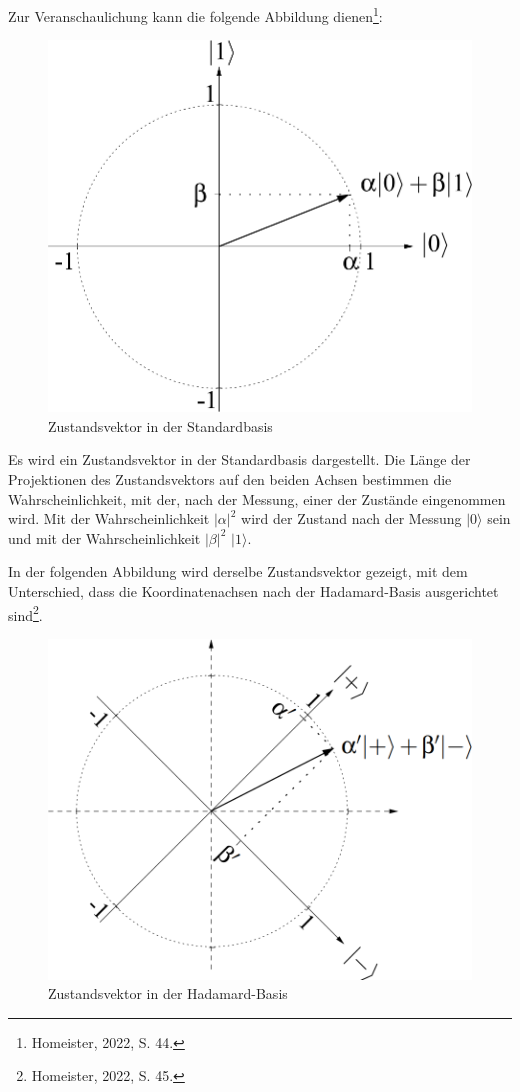 Zur Veranschaulichung kann die folgende Abbildung dienen\footnote{Homeister, 2022, S. 44.}: \\


\begin{figure}[!h]
    \centering
    \includegraphics[width=0.5\linewidth]{img/Zustandsvektor_Standardbasis.png}
    \caption{Zustandsvektor in der Standardbasis}
    \label{fig:Standardbasis}
\end{figure}

Es wird ein Zustandsvektor in der Standardbasis dargestellt. Die Länge der Projektionen des Zustandsvektors auf den beiden Achsen bestimmen die Wahrscheinlichkeit, mit der, nach der Messung, einer der Zustände eingenommen wird. Mit der Wahrscheinlichkeit $\left|\alpha\right|^2$ wird der Zustand nach der Messung $\left|0\right.\rangle$ sein und mit der Wahrscheinlichkeit $\left|\beta\right|^2$ $\left|1\right.\rangle$. 

In der folgenden Abbildung wird derselbe Zustandsvektor gezeigt, mit dem Unterschied, dass die Koordinatenachsen nach der Hadamard-Basis ausgerichtet sind\footnote{Homeister, 2022, S. 45.}.

\begin{figure}[h]
    \centering
    \includegraphics[width=0.5\linewidth]{img/Zustandsvektor_Hadamard-Basis.png}
    \caption{Zustandsvektor in der Hadamard-Basis}
    \label{fig:Hadamardbasis}
\end{figure}

